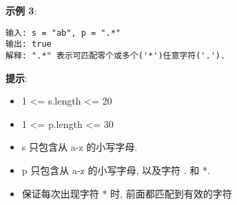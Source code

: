 \documentclass[oneside]{ctexbook}
\begin{document}
\textbf{示例 3}: 

\begin{verbatim}
输入: s = "ab", p = ".*"
输出: true
解释: ".*" 表示可匹配零个或多个('*')任意字符('.').
\end{verbatim}

\textbf{提示}:

\begin{itemize}
    \item 1 <= s.length <= 20
    \item 1 <= p.length <= 30
    \item s 只包含从 a-z 的小写字母. 
    \item p 只包含从 a-z 的小写字母, 以及字符 . 和 *.
    \item 保证每次出现字符 * 时, 前面都匹配到有效的字符
\end{itemize}
\end{document}
